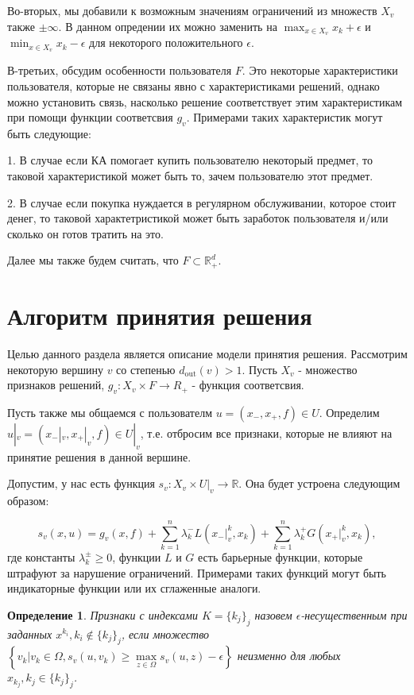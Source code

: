 \documentclass[12pt]{article}
\newtheorem{defin}{Определение}[section]
\begin{document}
Во-вторых, мы добавили к возможным значениям ограничений из множеств $X_v$ также $\pm \infty$. В данном опредении их можно заменить на $\max_{x\in X_v} x_k+ \epsilon$ и $\min_{x\in X_v} x_k - \epsilon$ для некоторого положительного $\epsilon$.

В-третьих, обсудим особенности пользователя $F$. Это некоторые характеристики пользователя, которые не связаны явно с характеристиками решений, однако можно установить связь, насколько решение соответствует этим характеристикам при помощи функции соответсвия $g_v$. Примерами таких характеристик могут быть следующие:

1. В случае если КА помогает купить пользователю некоторый предмет, то таковой характеристикой может быть то, зачем пользователю этот предмет.

2. В случае если покупка нуждается в регулярном обслуживании, которое стоит денег, то таковой характетристикой может быть заработок пользователя и/или сколько он готов тратить на это. 

Далее мы также будем считать, что $F \subset \mathbb{R}_+^d$.

\section{Алгоритм принятия решения}

Целью данного раздела является описание модели принятия решения. Рассмотрим некоторую вершину $v$ со степенью $d_\text{out}(v)>1$. Пусть $X_v$ - множество признаков решений, $g_v:X_v\times F \rightarrow R_+$ - функция соответсвия.

Пусть также мы общаемся с пользователм $u=(x_-, x_+, f) \in U$. Определим $u|_v = (x_-|_v, x_+|_v, f) \in U|_v$, т.е. отбросим все признаки, которые не влияют на принятие решения в данной вершине.

Допустим, у нас есть функция $s_v:X_v \times U|_v\rightarrow \mathbb{R}$. Она будет устроена следующим образом:

$$s_v(x, u) = g_v(x, f) + \sum\limits_{k=1}^n\lambda_k^- L(x_-|_v^k, x_k) + \sum\limits_{k=1}^n\lambda_k^+ G(x_+|_v^k, x_k),$$
где константы $\lambda_k^\pm \geq 0$, функции $L$ и $G$ есть барьерные функции, которые штрафуют за нарушение ограничений. Примерами таких функций могут быть индикаторные функции или их сглаженные аналоги.

\begin{defin}
Признаки с индексами $K=\{k_j\}_j$ назовем $\epsilon$-несущественным при заданных $x^{k_i}, k_i\notin\{k_j\}_j$, если множество $\left\{v_k\Big|v_k \in \Omega, s_v(u, v_k) \geq \max\limits_{z\in \Omega}s_v(u,z)-\epsilon\right\}$ неизменно для любых $x_{k_j}, k_j \in \{k_j\}_j$.
\end{defin}
\end{document}
